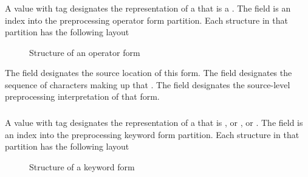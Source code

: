 
\subsubsection{}
\label{sec:ifc:FormSort:Operator}

A  value with tag  designates
the representation of a  that 
is a .
The  field is an index into
the preprocessing operator form partition.  Each structure in that partition
has the following layout
%
\begin{figure}[H]
  \centering
  \caption{Structure of an operator form}
  \label{fig:ifc-operator-form}
\end{figure}

The field  designates the source location of this form.  The
field  designates the sequence of characters making up that 
.  The field  designates the
source-level preprocessing interpretation of that form. 


\subsubsection{}
\label{sec:ifc:FormSort:Keyword}

A  value with tag  designates
the representation of a  that 
is , or , 
or .
The  field is an index into
the preprocessing keyword form partition.  Each structure in that partition
has the following layout
%
\begin{figure}[H]
  \centering
  \caption{Structure of a keyword form}
  \label{fig:ifc-keyword-form}
\end{figure}

